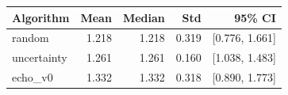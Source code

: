\begin{tabular}{lrrrr}
\hline
Algorithm & Mean & Median & Std & 95\% CI \\
\hline
random & 1.218 & 1.218 & 0.319 & [0.776, 1.661] \\
uncertainty & 1.261 & 1.261 & 0.160 & [1.038, 1.483] \\
echo\_v0 & 1.332 & 1.332 & 0.318 & [0.890, 1.773] \\
\hline
\end{tabular}

